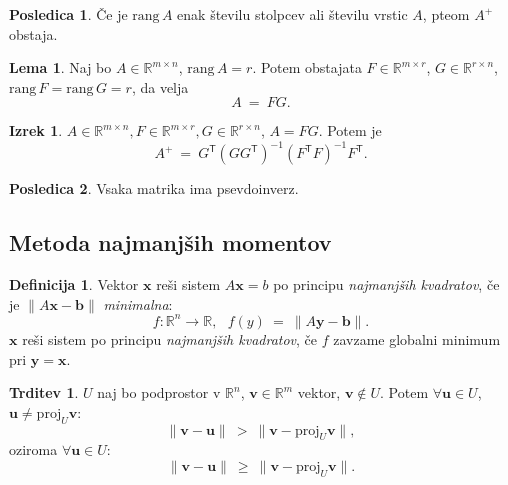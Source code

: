 \documentclass[11pt]{article}
\newcommand{\R}{\mathbb{R}}
\renewcommand{\b}{\mathbf{b}}
\newcommand{\x}{\mathbf{x}}
\newcommand{\y}{\mathbf{y}}
\renewcommand{\u}{\mathbf{u}}
\newcommand{\vv}{\mathbf{v}}
\newcommand{\0}{\mathbf{0}}
\newcommand{\rang}{\text{rang}\,}
\newcommand{\T}{\mathsf{T}}
\theoremstyle{definition}
\newtheorem{definicija}{Definicija}[section]
\theoremstyle{definition}
\newtheorem{trditev}{Trditev}[section]
\theoremstyle{definition}
\newtheorem{izrek}{Izrek}[section]
\theoremstyle{definition}
\newtheorem*{posledica}{Posledica}
\newtheorem{lema}{Lema}
\begin{document}
\begin{posledica}

Če je $\rang A$ enak številu stolpcev ali številu vrstic $A$, pteom $A^+$ obstaja.

\end{posledica}
\vspace{0.5cm}

\begin{lema}

Naj bo $A \in \R^{m \times n}$, $\rang A = r$. Potem obstajata $F \in \R^{m \times r}$, $G \in \R^{r \times n}$, $\rang F = \rang G = r$, da velja
$$A ~=~ FG.$$

\end{lema}
\vspace{0.5cm}

\begin{izrek}

$A \in \R^{m \times n}, F \in \R^{m \times r}, G \in \R^{r \times n}$, $A = FG$. Potem je
$$A^+ ~=~ G^\T (GG^\T)^{-1} (F^\T F)^{-1} F^\T.$$

\end{izrek}
\vspace{0.5cm}

\begin{posledica}

Vsaka matrika ima psevdoinverz.

\end{posledica}
\vspace{0.5cm}


\subsection{Metoda najmanjših momentov}
\vspace{0.5cm}

\begin{definicija}

Vektor $\x$ reši sistem $A\x = b$ po principu \textit{najmanjših kvadratov}, če je $\|A\x -\b\|$ \textit{minimalna}:
$$f: \R^n \rightarrow \R, ~~~f(y) ~=~ \|A\y-\b\|.$$
$\x$ reši sistem po principu \textit{najmanjših kvadratov}, če $f$ zavzame globalni minimum pri $\y=\x$.

\end{definicija}
\vspace{0.5cm}

\begin{trditev}

$U$ naj bo podprostor v $\R^n$, $\vv \in \R^m$ vektor, $\vv \notin U$. Potem $\forall \u \in U$, $\u \neq \text{proj}_U \vv$:
$$\|\vv - \u\| ~>~ \|\vv - \text{proj}_U \vv\|,$$
oziroma $\forall \u \in U$:
$$\|\vv - \u\| ~\geq~ \|\vv - \text{proj}_U \vv\|.$$

\end{trditev}
\vspace{0.5cm}
\end{document}
